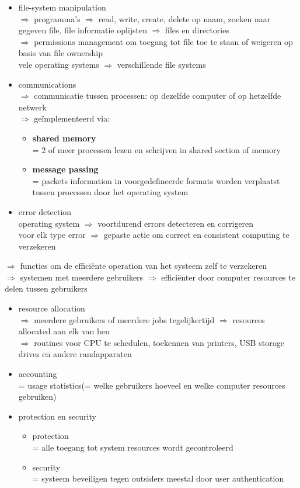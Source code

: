 \documentclass{report}
\begin{document}
\begin{itemize}
\item file-system manipulation
\\$\Rightarrow$ programma's $\Rightarrow$ read, write, create, delete op naam, zoeken naar gegeven file, file informatie oplijsten $\Rightarrow$ files en directories
\\$\Rightarrow$ permissions management om toegang tot file toe te staan of weigeren op basis van file ownership 
\\vele operating systems $\Rightarrow$ verschillende file systems
\item communications
\\$\Rightarrow$ communicatie tussen processen: op dezelfde computer of op hetzelfde netwerk
\\$\Rightarrow$ ge\"implementeerd via:
\begin{itemize}
\item \textbf{shared memory}
\\ = 2 of meer processen lezen en schrijven in shared section of memory
\item \textbf{message passing}
\\= packets information in voorgedefineerde formats worden verplaatst tussen processen door het operating system
\end{itemize}
\item error detection
\\ operating system $\Rightarrow$ voortdurend errors detecteren en corrigeren
\\ voor elk type error $\Rightarrow$ gepaste actie om correct en consistent computing te verzekeren
\end{itemize}
$\Rightarrow$ functies om de effici\"ente operation van het systeem zelf te verzekeren
\\$\Rightarrow$ systemen met meerdere gebruikers $\Rightarrow$ effici\"enter door computer resources 
te delen tussen gebruikers
\begin{itemize}
\item resource allocation
\\$\Rightarrow$ meerdere gebruikers of meerdere jobs tegelijkertijd $\Rightarrow$ resources allocated aan elk van hen
\\$\Rightarrow$ routines voor CPU te schedulen, toekennen van printers, USB storage drives en andere randapparaten
\item accounting
\\= usage statistics(= welke gebruikers hoeveel en welke computer resources gebruiken)
\item protection en security
\begin{itemize}
\item protection
\\= alle toegang tot system resources wordt gecontroleerd
\item security
\\= systeem beveiligen tegen outsiders meestal door user authentication
\end{itemize}
\end{itemize}
\end{document}

